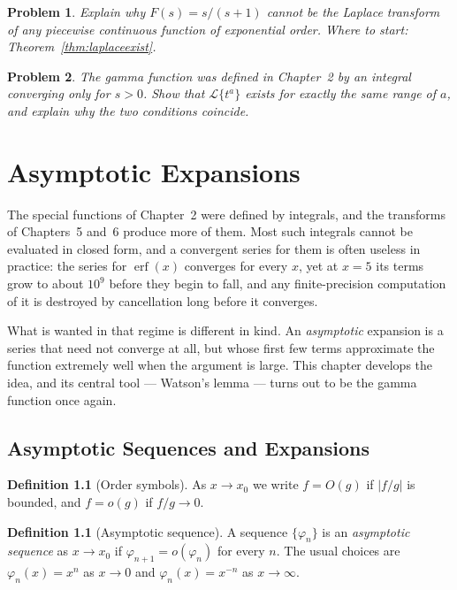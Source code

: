 \documentclass[12pt,a4paper]{report}
\theoremstyle{definition}
\newtheorem{defn}[thm]{Definition}
\theoremstyle{plain}
\newtheorem{problemx}{Problem}[section]
\newenvironment{problem}{\begin{problemx}}{\end{problemx}}
\begin{document}
\begin{problem}
Explain why $F(s) = s/(s+1)$ cannot be the Laplace transform of any piecewise
continuous function of exponential order.
\emph{Where to start: Theorem~\ref{thm:laplaceexist}.}
\end{problem}

\begin{problem}
The gamma function was defined in Chapter~2 by an integral converging only for
$s>0$. Show that $\mathcal{L}\{t^{a}\}$ exists for exactly the same range of
$a$, and explain why the two conditions coincide.
\end{problem}


\chapter{Asymptotic Expansions}

The special functions of Chapter~2 were defined by integrals, and the transforms
of Chapters~5 and~6 produce more of them. Most such integrals cannot be
evaluated in closed form, and a convergent series for them is often useless in
practice: the series for $\operatorname{erf}(x)$ converges for every $x$, yet at
$x=5$ its terms grow to about $10^{9}$ before they begin to fall, and any
finite-precision computation of it is destroyed by cancellation long before it
converges.

What is wanted in that regime is different in kind. An \emph{asymptotic}
expansion is a series that need not converge at all, but whose first few terms
approximate the function extremely well when the argument is large. This chapter
develops the idea, and its central tool --- Watson's lemma --- turns out to be
the gamma function once again.

\section{Asymptotic Sequences and Expansions}

\begin{defn}[Order symbols]
As $x\to x_0$ we write $f = O(g)$ if $|f/g|$ is bounded, and $f = o(g)$ if
$f/g\to0$.
\end{defn}

\begin{defn}[Asymptotic sequence]
A sequence $\{\varphi_n\}$ is an \emph{asymptotic sequence} as $x\to x_0$ if
$\varphi_{n+1} = o(\varphi_n)$ for every $n$. The usual choices are
$\varphi_n(x)=x^{n}$ as $x\to0$ and $\varphi_n(x)=x^{-n}$ as $x\to\infty$.
\end{defn}
\end{document}
